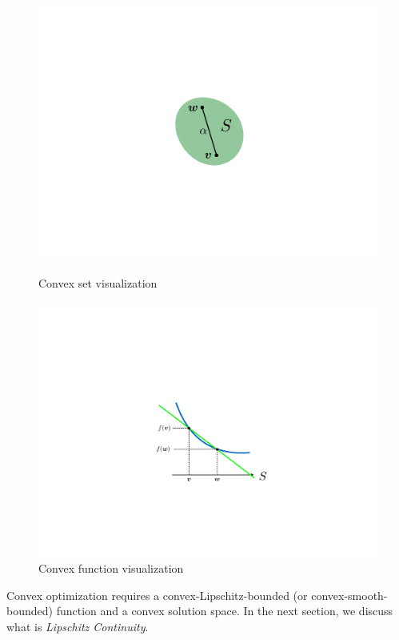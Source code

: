 \documentclass[11pt]{article}
\begin{document}
\begin{figure}[h]
\centering
\begin{minipage}{.5\textwidth}
    \centering
    \includegraphics[width=.60\linewidth]{figure/convex_geo.pdf}
    \caption{Convex set visualization}
    \label{fig:convex_geo}
\end{minipage}%
\begin{minipage}{.5\textwidth}
    \centering
    \includegraphics[width=.85\linewidth]{figure/convex_func_geo.pdf}
    \caption{Convex function visualization}
    \label{fig:convex_func_geo}
\end{minipage}
\end{figure}

Convex optimization requires a convex-Lipschitz-bounded (or convex-smooth-bounded) function and a convex solution space. In the next section, we discuss what is \textit{Lipschitz Continuity}.
\end{document}
